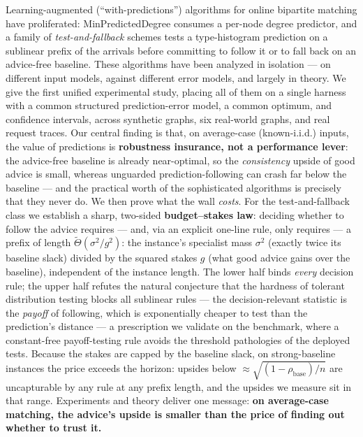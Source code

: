 Learning-augmented (``with-predictions'') algorithms for online
bipartite matching have proliferated: MinPredictedDegree consumes a
per-node degree predictor, and a family of \emph{test-and-fallback}
schemes tests a type-histogram prediction on a sublinear prefix of the
arrivals before committing to follow it or to fall back on an
advice-free baseline. These algorithms have been analyzed in isolation
--- on different input models, against different error models, and
largely in theory. We give the first unified experimental study, placing
all of them on a single harness with a common structured
prediction-error model, a common optimum, and confidence intervals,
across synthetic graphs, six real-world graphs, and real request traces.
Our central finding is that, on average-case (known-i.i.d.) inputs, the
value of predictions is \textbf{robustness insurance, not a performance
lever}: the advice-free baseline is already near-optimal, so the
\emph{consistency} upside of good advice is small, whereas unguarded
prediction-following can crash far below the baseline --- and the
practical worth of the sophisticated algorithms is precisely that they
never do. We then prove what the wall \emph{costs}. For the
test-and-fallback class we establish a sharp, two-sided
\textbf{budget--stakes law}: deciding whether to follow the advice
requires --- and, via an explicit one-line rule, only requires --- a
prefix of length \(\tilde\Theta(\sigma^2/g^2)\): the instance's
specialist mass \(\sigma^2\) (exactly twice its baseline slack) divided
by the squared stakes \(g\) (what good advice gains over the baseline),
independent of the instance length. The lower half binds \emph{every}
decision rule; the upper half refutes the natural conjecture that the
hardness of tolerant distribution testing blocks all sublinear rules ---
the decision-relevant statistic is the \emph{payoff} of following, which
is exponentially cheaper to test than the prediction's distance --- a
prescription we validate on the benchmark, where a constant-free
payoff-testing rule avoids the threshold pathologies of the deployed
tests. Because the stakes are capped by the baseline slack, on
strong-baseline instances the price exceeds the horizon: upsides below
\(\approx\sqrt{(1-\rho_{\mathrm{base}})/n}\) are uncapturable by any
rule at any prefix length, and the upsides we measure sit in that range.
Experiments and theory deliver one message: \textbf{on average-case
matching, the advice's upside is smaller than the price of finding out
whether to trust it.}
